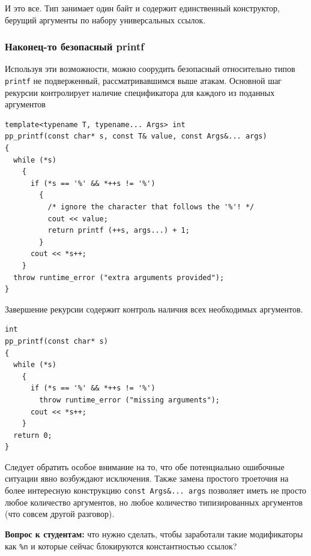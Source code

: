 \documentclass[a4paper,12pt,oneside]{article}
\newif\ifanswers
\begin{document}
И это все. Тип занимает один байт и содержит единственный конструктор, берущий аргументы по набору универсальных ссылок.
\fi

\subsubsection{Наконец-то безопасный printf}\label{TypesafePrintf}

Используя эти возможности, можно соорудить безопасный относительно типов \lstinline!printf! не подверженный, рассматривавшимся выше атакам. Основной шаг рекурсии контролирует наличие спецификатора для каждого из поданных аргументов

\begin{lstlisting}
template<typename T, typename... Args> int
pp_printf(const char* s, const T& value, const Args&... args)
{
  while (*s)
    {
      if (*s == '%' && *++s != '%')
        {
          /* ignore the character that follows the '%'! */
          cout << value;
          return printf (++s, args...) + 1;
        }
      cout << *s++;
    }
  throw runtime_error ("extra arguments provided");
}
\end{lstlisting}

Завершение рекурсии содержит контроль наличия всех необходимых аргументов.

\begin{lstlisting}
int
pp_printf(const char* s) 
{
  while (*s) 
    {
      if (*s == '%' && *++s != '%')
        throw runtime_error ("missing arguments");
      cout << *s++;
    }
  return 0;
}
\end{lstlisting}

Следует обратить особое внимание на то, что обе потенциально ошибочные ситуации явно возбуждают исключения. Также замена простого троеточия на более интересную конструкцию \lstinline!const Args&... args! позволяет иметь не просто любое количество аргументов, но любое количество типизированных аргументов (что совсем другой разговор).

\textbf{Вопрос к студентам:} что нужно сделать, чтобы заработали такие модификаторы как \lstinline!%n! и которые сейчас блокируются константностью ссылок?

\ifanswers
Правильный ответ: универсализовать ссылки

\begin{lstlisting}
template<typename T, typename... Args> int
pp_printf(const char* s, T&& value, Args&&... args)
\end{lstlisting}
\fi
\end{document}
